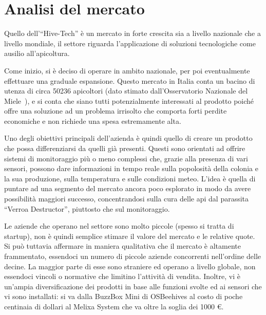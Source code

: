 \section{Analisi del mercato}
Quello dell'``Hive-Tech'' è un mercato in forte crescita sia a livello nazionale
che a livello mondiale, il settore riguarda l’applicazione di soluzioni
tecnologiche come ausilio all’apicoltura.

Come inizio, si è deciso di operare in ambito nazionale, per poi eventualmente
effettuare una graduale espansione. Questo mercato in Italia conta un bacino di
utenza di circa 50236 apicoltori (dato stimato dall’Osservatorio Nazionale del
Miele~\cite{miele}), e si conta che siano tutti potenzialmente interessati al prodotto poiché
offre una soluzione ad un problema irrisolto che comporta forti perdite
economiche e non richiede una spesa estremamente alta.

Uno degli obiettivi principali dell’azienda è quindi quello di creare un
prodotto che possa differenziarsi da quelli già presenti. Questi sono orientati
ad offrire sistemi di monitoraggio più o meno complessi che, grazie alla
presenza di vari sensori, possono dare informazioni in tempo reale sulla
popolosità della colonia e la sua produzione, sulla temperatura e sulle
condizioni meteo. L’idea è quella di puntare ad una segmento del mercato ancora
poco esplorato in modo da avere possibilità maggiori successo, concentrandosi
sulla cura delle api dal parassita “Verroa Destructor”, piuttosto che sul
monitoraggio.

Le aziende che operano nel settore sono molto piccole (spesso si tratta di
startup), non è quindi semplice stimare il valore del mercato e le relative
quote. Si può tuttavia affermare in maniera qualitativa che il mercato è
altamente frammentato, essendoci un numero di piccole  aziende concorrenti
nell’ordine delle decine. La maggior parte di esse sono straniere ed operano a
livello globale, non essendoci vincoli o normative che limitino l’attività di
vendita. Inoltre, vi è un’ampia diversificazione dei prodotti in base alle
funzioni svolte ed ai sensori che vi sono installati: si va dalla BuzzBox Mini
di OSBeehives al costo di poche centinaia di dollari al Melixa System che va
oltre la soglia dei 1000 \euro.

